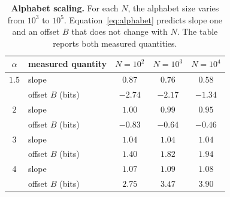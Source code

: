 \documentclass[11pt]{article}
\begin{document}
\begin{table}[htp]
  \centering
  \begin{tabular}{c l ccc}
    \toprule
    \(\alpha\) & measured quantity
    & \(N=10^2\) & \(N=10^3\) & \(N=10^4\) \\
    \midrule
    \(1.5\) & slope               & \(0.87\) & \(0.76\) & \(0.58\) \\
            & offset \(B\) (bits) & \(-2.74\) & \(-2.17\) & \(-1.34\) \\
    \addlinespace
    \(2\)   & slope               & \(1.00\) & \(0.99\) & \(0.95\) \\
            & offset \(B\) (bits) & \(-0.83\) & \(-0.64\) & \(-0.46\) \\
    \addlinespace
    \(3\)   & slope               & \(1.04\) & \(1.04\) & \(1.04\) \\
            & offset \(B\) (bits) & \(1.40\) & \(1.82\) & \(1.94\) \\
    \addlinespace
    \(4\)   & slope               & \(1.07\) & \(1.09\) & \(1.08\) \\
            & offset \(B\) (bits) & \(2.75\) & \(3.47\) & \(3.90\) \\
    \bottomrule
  \end{tabular}
  \caption{\textbf{Alphabet scaling.}
  For each \(N\), the alphabet size varies from \(10^3\) to \(10^5\).
  Equation~\eqref{eq:alphabet} predicts slope one and an offset \(B\) that
  does not change with \(N\). The table reports both measured quantities.}
  \label{tab:alphabet}
\end{table}
\end{document}
